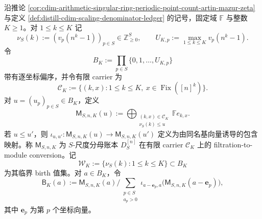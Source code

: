 \begin{definition}\label{distill:persistent_homology_persistence_modules_and_constructible_sheaf_persistence-constructible_jump_stratification-finite-periodic-denominator-module-definition}
沿推论 \ref{cor:cdim-arithmetic-singular-ring-periodic-point-count-artin-mazur-zeta} 与定义 \ref{def:distill-cdim-scaling-denominator-ledger} 的记号，固定域 \(\mathbb F\) 与整数 \(K\ge1\)。对 \(1\le k\le K\) 记
\[
\nu_S(k):=(v_p(n^k-1))_{p\in S}\in\mathbb Z_{\ge0}^{S},
\qquad
U_{K,p}:=\max_{1\le k\le K}v_p(n^k-1).
\]
令
\[
B_K:=\prod_{p\in S}\{0,1,\ldots,U_{K,p}\}
\]
带有逐坐标偏序，并令有限 carrier 为
\[
\mathcal C_K:=\{(k,x):1\le k\le K,\ x\in\operatorname{Fix}([n]^k)\}.
\]
对 \(u=(u_p)_{p\in S}\in B_K\)，定义
\[
\mathsf M_{S,n,K}(u)
:=\bigoplus_{\substack{(k,x)\in\mathcal C_K\\ \nu_S(k)\le u}}
\mathbb F e_{k,x}.
\]
若 \(u\le u'\)，则 \(\iota_{u,u'}:\mathsf M_{S,n,K}(u)\to\mathsf M_{S,n,K}(u')\) 定义为由同名基向量诱导的包含映射。称 \(\mathsf M_{S,n,K}\) 为 \(S\)-尺度分母账本 \(D_S^{[n]}\) 在有限 carrier \(\mathcal C_K\) 上的 filtration-to-module conversion。记
\[
\mathcal W_K:=\{\nu_S(k):1\le k\le K\}\subset B_K
\]
为其临界 birth 值集。对 \(a\in B_K\)，令
\[
\mathsf B_K(a):=\mathsf M_{S,n,K}(a)
\Big/
\sum_{\substack{p\in S\\ a_p>0}}
\iota_{a-\mathbf e_p,a}\bigl(\mathsf M_{S,n,K}(a-\mathbf e_p)\bigr),
\]
其中 \(\mathbf e_p\) 为第 \(p\) 个坐标向量。
\end{definition}

